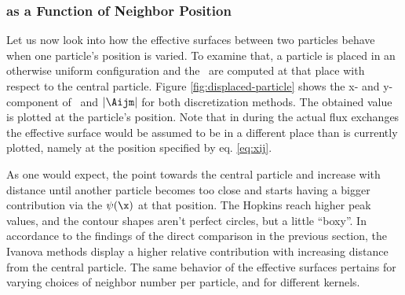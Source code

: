 \subsubsection{\Aij as a Function of Neighbor Position}

Let us now look into how the effective surfaces between two particles behave when one particle's
position is varied. To examine that, a particle is placed in an otherwise uniform configuration and
the \Aij\ are computed at that place with respect to the central particle. Figure
\ref{fig:displaced-particle} shows the x- and y- component of \Aij\ and $|\Aijm|$ for both
discretization methods. The obtained value is plotted at the particle's position. Note that in
during the actual flux exchanges the effective surface would be assumed to be in a different place
than is currently plotted, namely at the position specified by eq. \ref{eq:xij}.


As one would expect, the \Aij point towards the central particle and increase with distance until
another particle becomes too close and starts having a bigger contribution via the $\psi(\x)$ at
that position. The Hopkins \Aij reach higher peak values, and the contour shapes aren't perfect
circles, but a little ``boxy''. In accordance to the findings of the direct comparison in the
previous section, the Ivanova methods display a higher relative contribution with increasing
distance from the central particle. The same behavior of the effective surfaces pertains for varying
choices of neighbor number per particle, and for different kernels.




